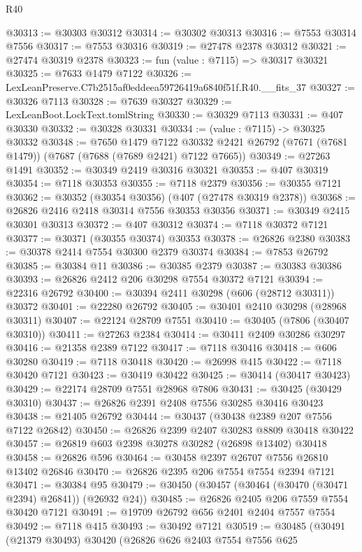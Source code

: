 \begin{lexlean}{R40}
\begin{coremodule}
@30313 := @30303 @30312
@30314 := @30302 @30313
@30316 := @7553 @30314 @7556
@30317 := @7553 @30316
@30319 := @27478 @2378 @30312
@30321 := @27474 @30319 @2378
@30323 := fun (value : @7115) => @30317 @30321
@30325 := @7633 @1479 @7122
@30326 := LexLeanPreserve.C7b2515af0eddeea59726419a6840f51f.R40.__fits_37
@30327 := @30326 @7113
@30328 := @7639 @30327
@30329 := LexLeanBoot.LockText.tomlString
@30330 := @30329 @7113
@30331 := @407 @30330
@30332 := @30328 @30331
@30334 := (value : @7115) -> @30325 @30332
@30348 := @7650
    @1479
    @7122
    @30332
    @2421
    @26792
    (@7671 (@7681 @1479))
    (@7687 (@7688 (@7689 @2421) @7122 @7665))
@30349 := @27263 @1491
@30352 := @30349 @2419 @30316 @30321
@30353 := @407 @30319
@30354 := @7118 @30353
@30355 := @7118 @2379
@30356 := @30355 @7121
@30362 := @30352 (@30354 @30356) (@407 (@27478 @30319 @2378))
@30368 := @26826 @2416 @2418 @30314 @7556 @30353 @30356
@30371 := @30349 @2415 @30301 @30313
@30372 := @407 @30312
@30374 := @7118 @30372 @7121
@30377 := @30371 (@30355 @30374) @30353
@30378 := @26826 @2380
@30383 := @30378 @2414 @7554 @30300 @2379 @30374
@30384 := @7853 @26792
@30385 := @30384 @11
@30386 := @30385 @2379
@30387 := @30383 @30386
@30393 := @26826 @2412 @206 @30298 @7554 @30372 @7121
@30394 := @22316 @26792
@30400 := @30394 @2411 @30298 (@606 (@28712 @30311)) @30372
@30401 := @22280 @26792
@30405 := @30401 @2410 @30298 (@28968 @30311)
@30407 := @22124 @28709 @7551
@30410 := @30405 (@7806 (@30407 @30310))
@30411 := @27263 @2384
@30414 := @30411 @2409 @30286 @30297
@30416 := @21358 @2389 @7122
@30417 := @7118 @30416
@30418 := @606 @30280
@30419 := @7118 @30418
@30420 := @26998 @415
@30422 := @7118 @30420 @7121
@30423 := @30419 @30422
@30425 := @30414 (@30417 @30423)
@30429 := @22174 @28709 @7551 @28968 @7806
@30431 := @30425 (@30429 @30310)
@30437 := @26826 @2391 @2408 @7556 @30285 @30416 @30423
@30438 := @21405 @26792
@30444 := @30437 (@30438 @2389 @207 @7556 @7122 @26842)
@30450 := @26826 @2399 @2407 @30283 @8809 @30418 @30422
@30457 := @26819 @603 @2398 @30278 @30282 (@26898 @13402) @30418
@30458 := @26826 @596
@30464 := @30458 @2397 @26707 @7556 @26810 @13402 @26846
@30470 := @26826 @2395 @206 @7554 @7554 @2394 @7121
@30471 := @30384 @95
@30479 := @30450 (@30457 (@30464 (@30470 (@30471 @2394) @26841)) (@26932 @24))
@30485 := @26826 @2405 @206 @7559 @7554 @30420 @7121
@30491 := @19709 @26792 @656 @2401 @2404 @7557 @7554
@30492 := @7118 @415
@30493 := @30492 @7121
@30519 := @30485
    (@30491
      (@21379 @30493)
      @30420
      (@26826
        @626
        @2403
        @7554
        @7556
        @625

\end{coremodule}
\end{lexlean}
